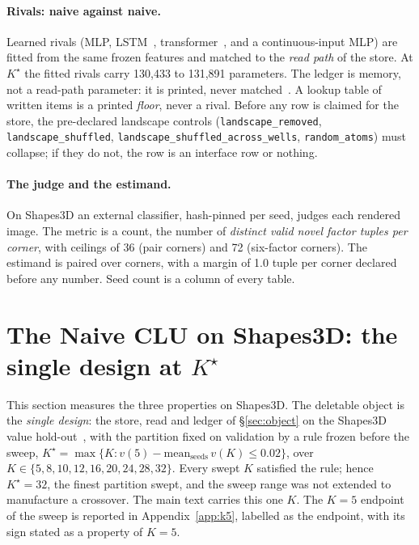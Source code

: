 \documentclass{article} %
\newcommand{\Kstar}{\ensuremath{K^{\star}}}
\begin{document}
\paragraph{Rivals: naive against naive.} Learned rivals (MLP, LSTM~\citep{hochreiter1997long}, transformer~\citep{vaswani2017attention}, and a
continuous-input MLP) are fitted from the same frozen features and matched to the
\emph{read path} of the store. At $\Kstar$ the fitted rivals carry 130,433 to 131,891 parameters.
The ledger is memory, not a read-path parameter: it is printed, never matched~\citep{borgeaud2021improving,khandelwal2020generalization,lample2019large,wu2022memorizing,berges2024memory}. A lookup table
of written items is a printed \emph{floor}, never a rival. Before any row is claimed for the
store, the pre-declared landscape controls (\texttt{landscape\_removed}, \texttt{landscape\_shuffled},
\texttt{landscape\_shuffled\_across\_wells}, \texttt{random\_atoms}) must collapse; if they do
not, the row is an interface row or nothing.

\paragraph{The judge and the estimand.} On Shapes3D an external classifier, hash-pinned per seed, judges each rendered image. The metric is a count, the number of \emph{distinct
valid novel factor tuples per corner}, with ceilings of 36 (pair corners) and 72 (six-factor
corners). The estimand is paired over corners, with a margin of 1.0 tuple per corner declared
before any number. %
Seed count is a column of every table.

\section{The Naive CLU on Shapes3D: the single design at $\Kstar$}
\label{sec:shapes}

This section measures the three properties on Shapes3D. The deletable object is the \emph{single design}: the store, read and ledger of
\S\ref{sec:object} on the Shapes3D value hold-out~\citep{montero2021role,schott2021visual}, with the partition fixed on validation
by a rule frozen before the sweep, $\Kstar=\max\{K : v(5)-\text{mean}_{\text{seeds}}\,v(K)\le
0.02\}$, over $K\in\{5,8,10,12,16,20,24,28,32\}$. Every swept $K$ satisfied the rule; hence
$\Kstar=32$, the finest partition swept, and the sweep range was not extended to manufacture a
crossover. %
The main text carries this one $K$. The $K=5$ endpoint of the sweep is reported in
Appendix~\ref{app:k5}, labelled as the endpoint, with its sign stated as a property of $K=5$.
\end{document}
